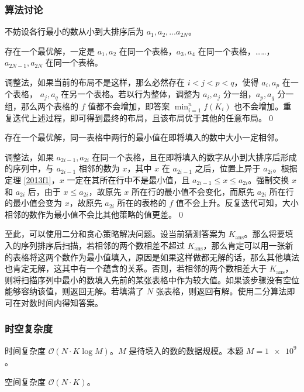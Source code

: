 			\subsubsection{算法讨论}
				不妨设各行最小的数从小到大排序后为 $a_1,a_2, \ldots a_{2N}$。
				\begin{theorem}
					存在一个最优解，一定是 $a_1,a_2$ 在同一个表格，$a_3,a_4$ 在同一个表格，……，$a_{2N-1},a_{2N}$ 在同一个表格。 \label{2013f1}
				\end{theorem}
				\begin{pf}
					调整法，如果当前的布局不是这样，那么必然存在 $i<j<p<q$，使得 $a_i,a_p$ 在一个表格， $a_j,a_q$ 在另一个表格。若以行为整体，调整为 $a_i,a_j$ 分一组，$a_p,a_q$ 分一组，那么两个表格的 $f$ 值都不会增加，即答案 $\textstyle \min_{i=1}^{n} f(K_i)$ 也不会增加。重复迭代上述过程，即可得到最终的布局，且该布局优于其他的任意布局。\qed
				\end{pf}
				\begin{theorem}
					存在一个最优解，同一表格中两行的最小值在即将填入的数中大小一定相邻。
				\end{theorem}
				\begin{pf}
					调整法，如果 $a_{2i-1}, a_{2i}$ 在同一个表格，且在即将填入的数字从小到大排序后形成的序列中，与 $a_{2i-1}$ 相邻的数为 $x$，其中 $x$ 在 $a_{2i-1}$ 之后，位置上异于 $a_{2i}$。根据定理  \ref{2013f1}，$x$ 一定在其所在行中不是最小值，且 $a_{2i-1} \le x \le a_{2i}$。强制交换 $x$ 和 $a_{2i}$ 后，由于  $x \le a_{2i}$，故原先 $x$ 所在行的最小值不会变化，而原先 $a_{2i}$  所在行的最小值会变为 $x$，故原先 $a_{2i}$  所在的表格的 $f$ 值不会上升。反复迭代可知，大小相邻的数作为最小值不会比其他策略的值更差。\qed
				\end{pf}
				至此，可以使用二分和贪心策略解决问题。设当前猜测答案为 $K_{\text{ans}}$。那么将要填入的序列排序后扫描，若相邻的两个数相差不超过 $K_{\text{ans}}$，那么肯定可以用一张新的表格将这两个数作为最小值填入，原因是如果这样做都无解的话，那么其他填法也肯定无解，这其中有一个蕴含的关系。否则，若相邻的两个数相差大于 $K_{\text{ans}}$，则将扫描序列中最小的数填入先前的某张表格中作为较大值。如果该步骤没有空位能够容纳该值，则返回无解。若填满了 $N$ 张表格，则返回有解。使用二分算法即可在对数时间内得知答案。
			\subsubsection{时空复杂度}
				时间复杂度 $\mathcal{O}\left(N\cdot K \log M \right)$。$M$ 是待填入的数的数据规模。本题 $M = \num{1e9}$。
			
				空间复杂度 $\mathcal{O}\left(N\cdot K \right)$。
		\newpage

